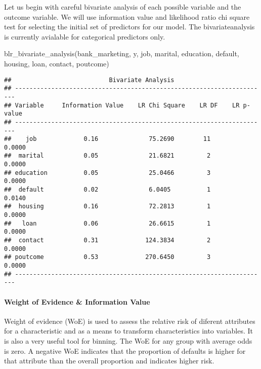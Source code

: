 \documentclass[
]{article}
\newenvironment{Shaded}{\begin{snugshade}}{\end{snugshade}}
\newcommand{\FunctionTok}[1]{\textcolor[rgb]{0.00,0.00,0.00}{#1}}
\newcommand{\NormalTok}[1]{#1}
\begin{document}
Let us begin with careful bivariate analysis of each possible variable
and the outcome variable. We will use information value and likelihood
ratio chi square test for selecting the initial set of predictors for
our model. The bivariateanalysis is currently avialable for categorical
predictors only.

\begin{Shaded}
\begin{Highlighting}[]
\FunctionTok{blr\_bivariate\_analysis}\NormalTok{(bank\_marketing, y, job, marital, education, default, }
\NormalTok{  housing, loan, contact, poutcome)}
\end{Highlighting}
\end{Shaded}

\begin{verbatim}
##                           Bivariate Analysis                           
## ----------------------------------------------------------------------
## Variable     Information Value    LR Chi Square    LR DF    LR p-value 
## ----------------------------------------------------------------------
##    job             0.16              75.2690        11        0.0000   
##  marital           0.05              21.6821         2        0.0000   
## education          0.05              25.0466         3        0.0000   
##  default           0.02              6.0405          1        0.0140   
##  housing           0.16              72.2813         1        0.0000   
##   loan             0.06              26.6615         1        0.0000   
##  contact           0.31             124.3834         2        0.0000   
## poutcome           0.53             270.6450         3        0.0000   
## ----------------------------------------------------------------------
\end{verbatim}

\hypertarget{weight-of-evidence-information-value}{%
\paragraph{Weight of Evidence \& Information
Value}\label{weight-of-evidence-information-value}}

Weight of evidence (WoE) is used to assess the relative risk of diferent
attributes for a characteristic and as a means to transform
characteristics into variables. It is also a very useful tool for
binning. The WoE for any group with average odds is zero. A negative WoE
indicates that the proportion of defaults is higher for that attribute
than the overall proportion and indicates higher risk.
\end{document}
